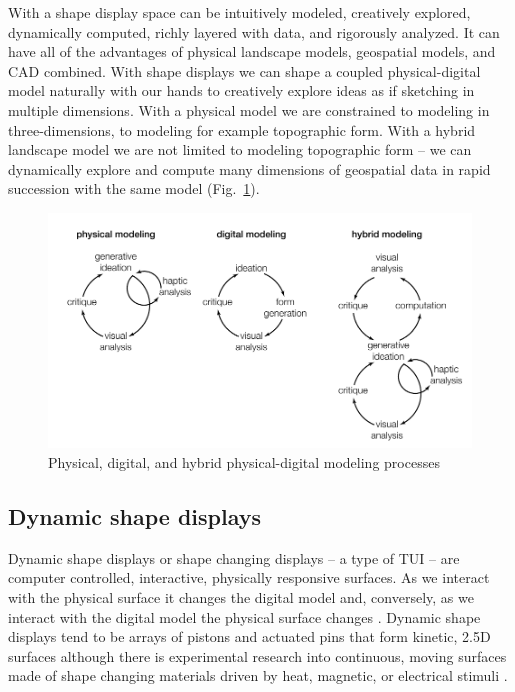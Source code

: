\documentclass{article}
\begin{document}
With a shape display space can be intuitively modeled, creatively explored, dynamically computed,
richly layered with data, and rigorously analyzed.
It can have all of the advantages of physical landscape models, geospatial models,
and CAD combined.
With shape displays 
we can shape a coupled physical-digital model naturally
with our hands to creatively explore ideas as if sketching in multiple dimensions.
With a physical model we are constrained to modeling in three-dimensions,
to modeling for example topographic form.
With a hybrid landscape model we are not limited to modeling topographic form -- we can dynamically
explore and compute many dimensions of geospatial data in rapid succession
with the same model (Fig.~\ref{fig:modeling}).

\begin{figure}[h]
        \centering
        \includegraphics[width=\textwidth]{images/intro/modeling_processes.pdf}
        \caption{Physical, digital, and hybrid physical-digital modeling processes}
        \label{fig:modeling}
\end{figure}

%
\subsection{Dynamic shape displays}
Dynamic shape displays or shape changing displays -- a type of
TUI --  are computer controlled, interactive,
physically responsive surfaces.
As we interact with the physical surface it changes the digital model and,
conversely, as we interact with the digital model the physical surface changes \citep{Ishii2008, Poupyrev2007}.
Dynamic shape displays tend to be arrays of pistons and actuated pins that form kinetic, 2.5D surfaces \citep{petrie2006}
 although there is experimental research into continuous, moving surfaces made of shape changing materials driven by heat, magnetic, or electrical stimuli \citep{Coelho2010}. 
\end{document}
